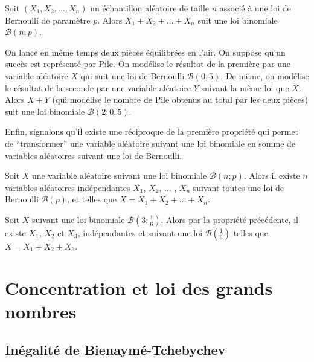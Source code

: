 	\begin{formula}
		Soit $(X_1, X_2, \dots, X_n)$ un échantillon aléatoire de taille $n$ associé à une loi de Bernoulli de paramètre $p$.
		\newpar
		Alors $X_1 + X_2 + \dots + X_n$ suit une loi binomiale $\mathcal{B}(n; p)$.
	\end{formula}

	\begin{tip}[Exemple]
		On lance en même temps deux pièces équilibrées en l'air. On suppose qu'un succès est représenté par Pile.
		\newpar
		On modélise le résultat de la première par une variable aléatoire $X$ qui suit une loi de Bernoulli $\mathcal{B}(0,5)$. De même, on modélise le résultat de la seconde par une variable aléatoire $Y$ suivant la même loi que $X$.
		\newpar
		Alors $X + Y$ (qui modélise le nombre de Pile obtenus au total par les deux pièces) suit une loi binomiale $\mathcal{B}(2; 0,5)$.
	\end{tip}

	Enfin, signalons qu'il existe une réciproque de la première propriété qui permet de ``transformer'' une variable aléatoire suivant une loi binomiale en somme de variables aléatoires suivant une loi de Bernoulli.

	\begin{formula}
		Soit $X$ une variable aléatoire suivant une loi binomiale $\mathcal{B}(n; p)$.
		\newpar
		Alors il existe $n$ variables aléatoires indépendantes $X_1$, $X_2$, ... , $X_n$ suivant toutes une loi de Bernoulli $\mathcal{B}(p)$, et telles que $X = X_1 + X_2 + \dots + X_n$.
	\end{formula}

	\begin{tip}[Exemple]
		Soit $X$ suivant une loi binomiale $\mathcal{B}\left(3; \frac{1}{6}\right)$. Alors par la propriété précédente, il existe $X_1$, $X_2$ et $X_3$, indépendantes et suivant une loi $\mathcal{B}\left(\frac{1}{6}\right)$ telles que $X = X_1 + X_2 + X_3$.
	\end{tip}

	\section{Concentration et loi des grands nombres}

	\subsection{Inégalité de Bienaymé-Tchebychev}

